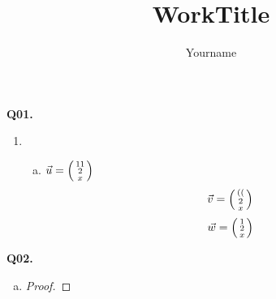 \documentclass[11pt]{article}
\author{Yourname}
\title{WorkTitle}
\begin{document}
\setlength{\abovedisplayskip}{5pt}
\setlength{\belowdisplayskip}{5pt}
\parindent=0pt
\thispagestyle{firstpage}

\inserthead

\textbf{Q01.}

\begin{enumerate}
    \item \begin{enumerate}[(a), topsep=0pt]
            \item $\u = \ve{11, 2, x}$
                    $$\v = \ve{((, 2, x}$$
                    \[
                        \w = \ve{1, 2, x}
                    \]
        \end{enumerate}
\end{enumerate}

\newpage

\textbf{Q02.}

\begin{enumerate}[(a)]
    \item \begin{proof}
        \end{proof}
\end{enumerate}
\end{document}
